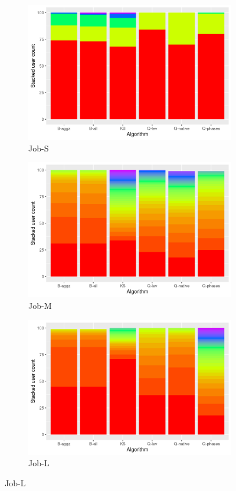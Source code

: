 \documentclass{jhps}
\begin{document}
\begin{figure}[bt]
\begin{subfigure}{0.31\textwidth}
\centering
\includegraphics[width=\textwidth]{job_similarities_4296426-out/user-ids}
\caption{Job-S}\label{fig:users-job-S}
\end{subfigure}
\begin{subfigure}{0.31\textwidth}
\centering
\includegraphics[width=\textwidth]{job_similarities_5024292-out/user-ids}
\caption{Job-M}\label{fig:users-job-M}
\end{subfigure}
\begin{subfigure}{0.31\textwidth}
\centering
\includegraphics[width=\textwidth]{job_similarities_7488914-out/user-ids}
\caption{Job-L}\label{fig:users-job-L}
\end{subfigure}


\end{figure}
\end{document}
